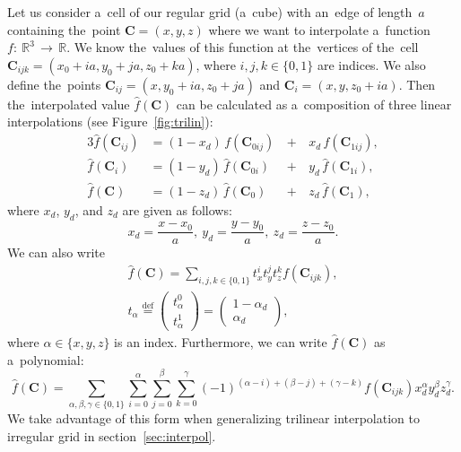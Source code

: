 			Let us consider a~cell of our regular grid (a~cube) with an~edge of length~$a$ containing the~point $\mathbf{C} = (x,y,z)$ where we want to interpolate a~function $f\!\!:~\!\!\mathbb{R}^3\,\to\,\mathbb{R}$. We know the~values of this function at the~vertices of the~cell $\mathbf{C}_{ijk} = (x_0+ia,y_0+ja,z_0+ka)$, where $i,j,k \in \{0,1\}$ are indices. We also define the~points $\mathbf{C}_{ij} = (x,y_0+ia,z_0+ja)$ and $\mathbf{C}_i=(x,y,z_0+ia)$. Then the~interpolated value $\widehat{f}(\mathbf{C})$ can be calculated as a~composition of three linear interpolations (see Figure~\ref{fig:trilin}):
				\begin{alignat}{3}
					\widehat{f}(\mathbf{C}_{ij}) &= (1-x_d)\,f(\mathbf{C}_{0ij}) \,&+&\,x_d\, f(\mathbf{C}_{1ij}),\\
					\widehat{f}(\mathbf{C}_{i}) &= (1-y_d)\,\widehat{f}(\mathbf{C}_{0i}) &+&\,y_d\, \widehat{f}(\mathbf{C}_{1i}),\\
					\widehat{f}(\mathbf{C}) &= (1-z_d)\,\widehat{f}(\mathbf{C}_0) &+&\,z_d\, \widehat{f}(\mathbf{C}_1),
				\end{alignat}
			where $x_d$, $y_d$, and $z_d$ are given as follows:
				\begin{equation}
					x_d = \frac{x-x_0}{a},~y_d = \frac{y-y_0}{a},~z_d = \frac{z-z_0}{a}.
				\end{equation}
			We can also write
				\begin{eqnarray}
					\widehat{f}(\mathbf{C}) = \sum_{i,j,k \in \{0,1\}} t_x^i t_y^j t_z^k f(\mathbf{C}_{ijk}),\\
					t_\alpha \stackrel{\text{def}}{=} \begin{pmatrix}t_\alpha^0\\ t_\alpha^1\end{pmatrix} = \begin{pmatrix}1-\alpha_d\\ \alpha_d\end{pmatrix},
				\end{eqnarray}
			where $\alpha \in \{x,y,z\}$ is an index. Furthermore, we can write $\widehat{f}(\mathbf{C})$ as a~polynomial:
				\begin{equation}
					\label{eq:trilinpoly}
					\widehat{f}(\mathbf{C}) = \sum_{\alpha,\beta,\gamma \in \{0,1\}}\sum^{\alpha}_{i=0}\sum^{\beta}_{j=0}\sum^{\gamma}_{k=0} 	(-1)^{(\alpha-i)+(\beta-j)+(\gamma-k)} f(\mathbf{C}_{ijk}) x_d^\alpha y_d^\beta z_d^\gamma.
				\end{equation}
			We take advantage of this form when generalizing trilinear interpolation to irregular grid in section~\ref{sec:interpol}.
				

